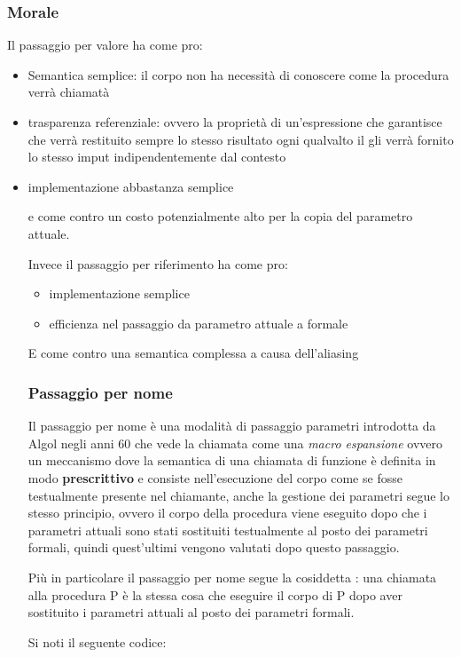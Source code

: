 \subsubsection{Morale}
Il passaggio per valore ha come pro:
\begin{itemize}
    \item Semantica semplice: il corpo non ha necessità di conoscere come la procedura verrà chiamatà
    \item trasparenza referenziale: ovvero la proprietà di un'espressione che garantisce che verrà restituito sempre lo stesso risultato ogni qualvalto il gli verrà fornito lo stesso imput indipendentemente dal contesto
    \item implementazione abbastanza semplice
    
e come contro un costo potenzialmente alto per la copia del parametro attuale.

Invece il passaggio per riferimento ha come pro:
\begin{itemize}
    \item implementazione semplice
    \item efficienza nel passaggio da parametro attuale a formale
\end{itemize}

E come contro una semantica complessa a causa dell'aliasing

\subsubsection{Passaggio per nome}

Il passaggio per nome è una modalità di passaggio parametri introdotta da Algol negli anni 60 che vede la chiamata come una \textit{macro espansione} ovvero un meccanismo dove la semantica di una chiamata di funzione è definita in modo \textbf{prescrittivo} e consiste nell'esecuzione del corpo come se fosse testualmente presente nel chiamante, anche la gestione dei parametri segue lo stesso principio, ovvero il corpo della procedura viene eseguito dopo che i parametri attuali sono stati sostituiti testualmente al posto dei parametri formali, quindi quest'ultimi vengono valutati dopo questo passaggio. 

Più in particolare il passaggio per nome segue la cosiddetta : una chiamata alla procedura P è la stessa cosa che eseguire il corpo di P dopo aver sostituito i parametri attuali al posto dei parametri formali.

Si noti il seguente codice:


\end{itemize}
